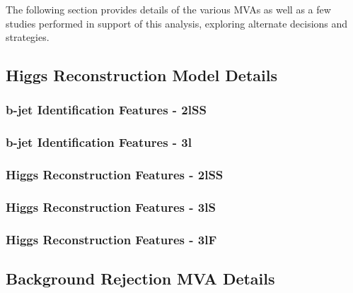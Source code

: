 
The following section provides details of the various MVAs as well as a few studies performed in support of this analysis, exploring alternate decisions and strategies. 

\subsection{Higgs Reconstruction Model Details}
\label{subsec:recoApx}
 
\subsubsection{b-jet Identification Features - 2lSS}


\subsubsection{b-jet Identification Features - 3l}


\subsubsection{Higgs Reconstruction Features - 2lSS}


\subsubsection{Higgs Reconstruction Features - 3lS}                                                                         
 

\subsubsection{Higgs Reconstruction Features - 3lF} 
 


\subsection{Background Rejection MVA Details}
\label{subsec:sigBkgApx}
 
